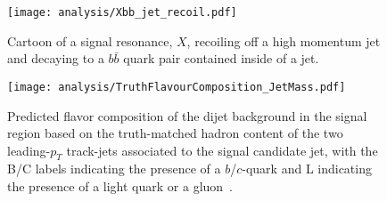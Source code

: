 \begin{figure}[htbp]
 \centering
 \texttt{[image: analysis/Xbb\_jet\_recoil.pdf]}
 \caption[Cartoon of a signal resonance recoiling of a high momentum jet.]{%
  Cartoon of a signal resonance, $X$, recoiling off a high momentum jet and decaying to a $b\bar{b}$ quark pair contained inside of a \largeR{} jet.}
 \label{fig:Xbb_jet_recoil}
\end{figure}

\begin{figure}[htbp]
 \centering
 \texttt{[image: analysis/TruthFlavourComposition\_JetMass.pdf]}
 \caption[Predicted flavor composition of the dijet background in the signal region.]{%
  Predicted flavor composition of the dijet background in the signal region based on the truth-matched hadron content of the two leading-$p_{T}$ track-jets associated to the signal candidate \largeR{} jet, with the B/C labels indicating the presence of a $b$/$c$-quark and L indicating the presence of a light quark or a gluon~\cite{ATLAS-CONF-2018-052}.}
 \label{fig:SR_flavor_composition}
\end{figure}

